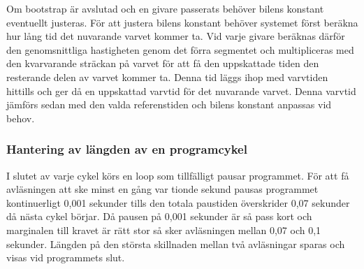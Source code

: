 Om bootstrap är avslutad och en givare passerats behöver bilens konstant
eventuellt justeras. För att justera bilens konstant behöver systemet först beräkna hur lång tid det
nuvarande varvet kommer ta. Vid varje givare beräknas därför den genomsnittliga
hastigheten genom det förra segmentet och multipliceras med den kvarvarande
sträckan på varvet för att få den uppskattade tiden den resterande delen av
varvet kommer ta. Denna tid läggs ihop med varvtiden hittills och ger då en
uppskattad varvtid för det nuvarande varvet. Denna varvtid jämförs sedan med den
valda referenstiden och bilens konstant anpassas vid behov.

%  



\subsubsection{Hantering av längden av en programcykel}
\label{sec:system:korning:cykel}

I slutet av varje cykel körs en loop som tillfälligt pausar programmet.
För att få avläsningen att ske minst en gång var tionde sekund pausas
programmet kontinuerligt 0,001 sekunder tills den totala paustiden överskrider 
0,07 sekunder då nästa cykel börjar. Då pausen på 0,001 sekunder är så pass
kort och marginalen till kravet är rätt stor så sker avläsningen mellan
0,07 och 0,1 sekunder. Längden på den största skillnaden mellan två avläsningar
sparas och visas vid programmets slut.


